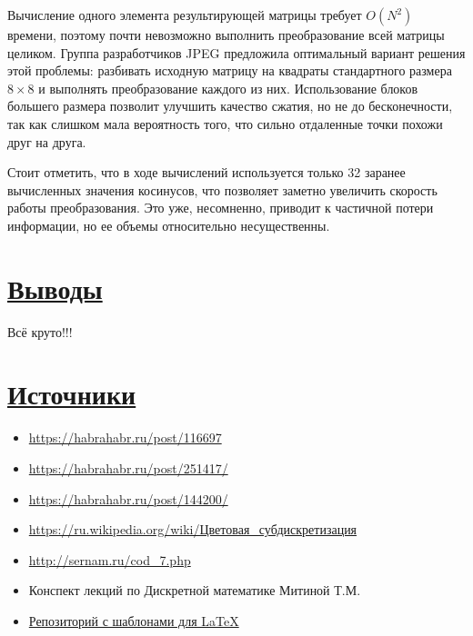 Вычисление одного элемента результирующей матрицы требует $O(N^2)$ времени, поэтому почти невозможно выполнить преобразование всей матрицы целиком. Группа разработчиков JPEG предложила оптимальный вариант решения этой проблемы: разбивать исходную матрицу на квадраты стандартного размера $8\times8$ и выполнять преобразование каждого из них. Использование блоков большего размера позволит улучшить качество сжатия, но не до бесконечности, так как слишком мала вероятность того, что сильно отдаленные точки похожи друг на друга.

Стоит отметить, что в ходе вычислений используется только 32 заранее вычисленных значения косинусов, что позволяет заметно увеличить скорость работы преобразования. Это уже, несомненно, приводит к частичной потери информации, но ее объемы относительно несущественны.

\section*{\hyperlink{toc}{Выводы}}

Всё круто!!!

\section*{\hyperlink{toc}{Источники}}

\begin{itemize}

	\item\href{https://habrahabr.ru/post/116697}{https://habrahabr.ru/post/116697}
	\item\href{https://habrahabr.ru/post/251417/}{https://habrahabr.ru/post/251417/}
	\item\href{https://habrahabr.ru/post/144200/}{https://habrahabr.ru/post/144200/}
	\item\href{https://ru.wikipedia.org/wiki/%D0%A6%D0%B2%D0%B5%D1%82%D0%BE%D0%B2%D0%B0%D1%8F_%D1%81%D1%83%D0%B1%D0%B4%D0%B8%D1%81%D0%BA%D1%80%D0%B5%D1%82%D0%B8%D0%B7%D0%B0%D1%86%D0%B8%D1%8F}{https://ru.wikipedia.org/wiki/Цветовая\_субдискретизация}
	\item\href{http://sernam.ru/cod_7.php}{http://sernam.ru/cod\_7.php}
	\item Конспект лекций по Дискретной математике Митиной Т.М.
	\item\href{https://github.com/ejiek/latex_templates}{Репозиторий с шаблонами для \LaTeX}
	
\end{itemize}
\newpage

